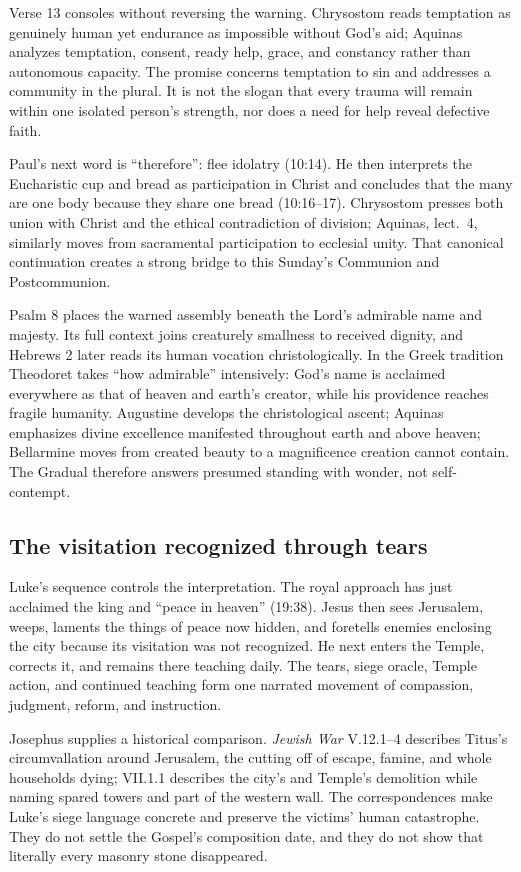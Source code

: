 Verse 13 consoles without reversing the warning. Chrysostom reads temptation as genuinely human yet endurance as impossible without God's aid; Aquinas analyzes temptation, consent, ready help, grace, and constancy rather than autonomous capacity. The promise concerns temptation to sin and addresses a community in the plural. It is not the slogan that every trauma will remain within one isolated person's strength, nor does a need for help reveal defective faith.

Paul's next word is ``therefore'': flee idolatry (10:14). He then interprets the Eucharistic cup and bread as participation in Christ and concludes that the many are one body because they share one bread (10:16--17). Chrysostom presses both union with Christ and the ethical contradiction of division; Aquinas, lect.~4, similarly moves from sacramental participation to ecclesial unity. That canonical continuation creates a strong bridge to this Sunday's Communion and Postcommunion.

Psalm 8 places the warned assembly beneath the Lord's admirable name and majesty. Its full context joins creaturely smallness to received dignity, and Hebrews 2 later reads its human vocation christologically. In the Greek tradition Theodoret takes ``how admirable'' intensively: God's name is acclaimed everywhere as that of heaven and earth's creator, while his providence reaches fragile humanity. Augustine develops the christological ascent; Aquinas emphasizes divine excellence manifested throughout earth and above heaven; Bellarmine moves from created beauty to a magnificence creation cannot contain. The Gradual therefore answers presumed standing with wonder, not self-contempt.

\sectionguard
\subsection*{The visitation recognized through tears\enspace{}}

Luke's sequence controls the interpretation. The royal approach has just acclaimed the king and ``peace in heaven'' (19:38). Jesus then sees Jerusalem, weeps, laments the things of peace now hidden, and foretells enemies enclosing the city because its visitation was not recognized. He next enters the Temple, corrects it, and remains there teaching daily. The tears, siege oracle, Temple action, and continued teaching form one narrated movement of compassion, judgment, reform, and instruction.

Josephus supplies a historical comparison. \emph{Jewish War} V.12.1--4 describes Titus's circumvallation around Jerusalem, the cutting off of escape, famine, and whole households dying; VII.1.1 describes the city's and Temple's demolition while naming spared towers and part of the western wall. The correspondences make Luke's siege language concrete and preserve the victims' human catastrophe. They do not settle the Gospel's composition date, and they do not show that literally every masonry stone disappeared.

